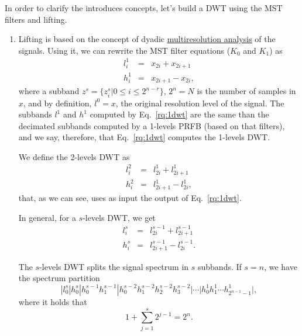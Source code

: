 In order to clarify the introduces concepts, let's build a DWT using
the MST filters and lifting.

\begin{enumerate}
\item Lifting is based on the concept of dyadic
  \href{https://en.wikipedia.org/wiki/Multiresolution_analysis}{multiresolution
    analysis} of the signals. Using it, we can rewrite the MST filter
  equations ($K_0$ and $K_1$) as
  \begin{equation}
    \begin{array}{rcl}
      l^1_i & = & x_{2i} + x_{2i+1} \\
      h^1_i & = & x_{2i+1} - x_{2i},
    \end{array}
    \label{eq:1dwt}
  \end{equation}
  where a subband $z^s=\{z_i^s|0\le i\le 2^{n-r}\}$, $2^n=N$ is the
  number of samples in $x$, and by definition, $l^0=x$, the original
  resolution level of the signal. The subbands $l^1$ and $h^1$
  computed by Eq.~\ref{rq:1dwt} are the same than the decimated
  subbands computed by a 1-levels PRFB (based on that filters), and we
  say, therefore, that Eq.~\ref{rq:1dwt} computes the 1-levels DWT.

  We define the 2-levels DWT as
  \begin{equation}
    \begin{array}{rcl}
      l^2_i & = & l^1_{2i} + l^1_{2i+1} \\
      h^2_i & = & l^1_{2i+1} - l^1_{2i},
    \end{array}
    \label{eq:2dwt}
  \end{equation}
  that, as we can see, uses as input the output of Eq.~\ref{rq:1dwt}.

  In general, for a $s$-levels DWT, we get
    \begin{equation}
    \begin{array}{rcl}
      l^s_i & = & l^{s-1}_{2i} + l^{s-1}_{2i+1} \\
      h^s_i & = & l^{s-1}_{2i+1} - l^{s-1}_{2i}.
    \end{array}
    \label{eq:2dwt}
  \end{equation}

  The $s$-levels DWT splits the signal spectrum in $s$ subbands. If
  $s=n$, we have the spectrum partition
  \begin{equation*}
    | l^s_0 | h^s_0 | h^{s-1}_0 h^{s-1}_1 | h^{s-2}_0 h^{s-2}_1 h^{s-2}_2 h^{s-2}_3 | \cdots | h^1_0 h^1_1 \cdots h^1_{2^{n-1}-1} |,
  \end{equation*}
  where it holds that
  \begin{equation}
    1+\sum_{j=1}^s 2^{j-1}=2^n.
  \end{equation}


\end{enumerate}
